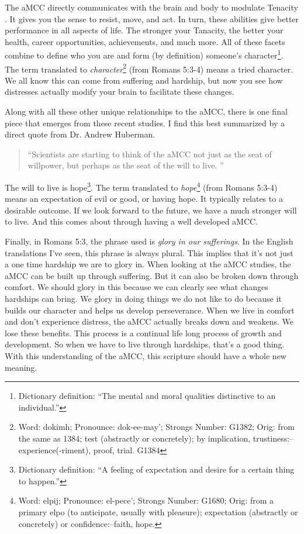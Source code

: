 \documentclass[9.5pt]{article}
\begin{document}
\begin{multicols}{2}
The aMCC directly communicates with the brain and body to modulate Tenacity \cite{HubermanLab}. It gives you the sense to resist, move, and act. In turn, these abilities give better performance in all aspects of life. The stronger your Tanacity, the better your health, career opportunities, achievements, and much more. All of these facets combine to define who you are and form (by definition) someone's character\footnote{Dictionary definition: ``The mental and moral qualities distinctive to an individual.''}. The term translated to \textit{character}\footnote{Word: dokimh; Pronounce: dok-ee-may'; Strongs Number: G1382; Orig: from the same as 1384; test (abstractly or concretely); by implication, trustiness:--experience(-riment), proof, trial. G1384} (from Romans 5:3-4) means a tried character. We all know this can come from suffering and hardship, but now you see how distresses actually modify your brain to facilitate these changes.

Along with all these other unique relationships to the aMCC, there is one final piece that emerges from these recent studies. I find this best summarized by a direct quote from Dr. Andrew Huberman. 

\begin{quotation}
``Scientists are starting to think of the aMCC not just as the seat of willpower, but perhaps as the seat of the will to live. \cite{Goggins}''
\end{quotation}

The will to live is hope\footnote{Dictionary definition: “A feeling of expectation and desire for a certain thing to happen.”}. The term translated to \textit{hope}\footnote{Word: elpij; Pronounce: el-pece'; Strongs Number: G1680; Orig: from a primary elpo (to anticipate, usually with pleasure); expectation (abstractly or concretely) or confidence:--faith, hope.} (from Romans 5:3-4) means an expectation of evil or good, or having hope. It typically relates to a desirable outcome. If we look forward to the future, we have a much stronger will to live. And this comes about through having a well developed aMCC.

Finally, in Romans 5:3, the phrase used is \textit{glory in our sufferings}. In the English translations I've seen, this phrase is always plural. This implies that it's not just a one time hardship we are to glory in. When looking at the aMCC studies, the aMCC can be built up through suffering. But it can also be broken down through comfort. We should glory in this because we can clearly see what changes hardships can bring. We glory in doing things we do not like to do because it builds our character and helps us develop perseverance. When we live in comfort and don't experience distress, the aMCC actually breaks down and weakens. We lose these benefits. This process is a continual life long process of growth and development. So when we have to live through hardships, that's a good thing. With this understanding of the aMCC, this scripture should have a whole new meaning.


\end{multicols}
\end{document}

